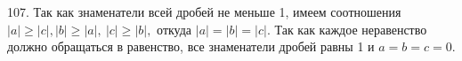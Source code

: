 107. Так как знаменатели всей дробей не меньше 1, имеем соотношения $|a|\geqslant |c|, |b|\geqslant |a|,\ |c|\geqslant |b|,$ откуда
$|a|=|b|=|c|.$ Так как каждое неравенство должно обращаться в равенство, все знаменатели дробей равны 1 и $a=b=c=0.$\\
